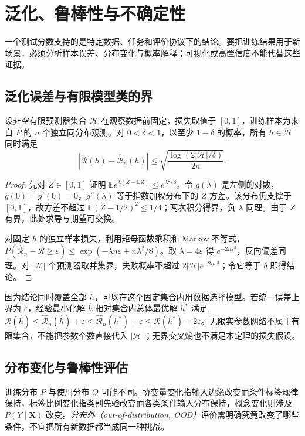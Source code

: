 \setcounter{chapter}{22} %
\chapter{泛化、鲁棒性与不确定性}
\label{chap:dl-reliability}
一个测试分数支持的是特定数据、任务和评价协议下的结论。要把训练结果用于新场景，必须分析样本误差、分布变化与概率解释；可视化或高置信度不能代替这些证据。

\section{泛化误差与有限模型类的界}
\begin{theorem}[有限模型类的一致界]
设非空有限预测器集合 $\mathcal H$ 在观察数据前固定，损失取值于 $[0,1]$，训练样本为来自 $P$ 的 $n$ 个独立同分布观测。对 $0<\delta<1$，以至少 $1-\delta$ 的概率，所有 $h\in\mathcal H$ 同时满足
\begin{equation}
|\mathcal R(h)-\widehat{\mathcal R}_n(h)|\leq
\sqrt{\frac{\log(2|\mathcal H|/\delta)}{2n}}.
\label{eq:dl-finite-generalization}
\end{equation}
\end{theorem}
\begin{proof}
先对 $Z\in[0,1]$ 证明 $\mathbb E e^{\lambda(Z-\mathbb EZ)}\leq e^{\lambda^2/8}$。令 $g(\lambda)$ 是左侧的对数，$g(0)=g'(0)=0$，$g''(\lambda)$ 等于指数加权分布下的 $Z$ 方差。该分布仍支撑于 $[0,1]$，故方差不超过 $\mathbb E(Z-1/2)^2\leq1/4$；两次积分得界，负 $\lambda$ 同理。由于 $Z$ 有界，此处求导与期望可交换。

对固定 $h$ 的独立样本损失，利用矩母函数乘积和 Markov 不等式，$P(\widehat{\mathcal R}_n-\mathcal R\geq\varepsilon)\leq\exp(-\lambda n\varepsilon+n\lambda^2/8)$。取 $\lambda=4\varepsilon$ 得 $e^{-2n\varepsilon^2}$，反向偏差同理。对 $|\mathcal H|$ 个预测器取并集界，失败概率不超过 $2|\mathcal H|e^{-2n\varepsilon^2}$；令它等于 $\delta$ 即得结论。
\end{proof}
因为结论同时覆盖全部 $h$，可以在这个固定集合内用数据选择模型。若统一误差上界为 $\varepsilon$，经验最小化解 $\widehat h$ 相对集合内总体最优解 $h^*$ 满足 $\mathcal R(\widehat h)\leq\widehat{\mathcal R}_n(\widehat h)+\varepsilon\leq\widehat{\mathcal R}_n(h^*)+\varepsilon\leq\mathcal R(h^*)+2\varepsilon$。无限实参数网络不属于有限集合，不能把参数个数直接代入 $|\mathcal H|$；无界交叉熵也不满足本定理的损失假设。

\section{分布变化与鲁棒性评估}
训练分布 $P$ 与使用分布 $Q$ 可能不同。协变量变化指输入边缘改变而条件标签规律保持，标签比例变化指类别先验改变而各类条件输入分布保持，概念变化则涉及 $P(Y\mid\mathbf X)$ 改变。\emph{分布外（out-of-distribution, OOD）}评价需明确究竟改变了哪些条件，不宜把所有新数据都当成同一种挑战。


